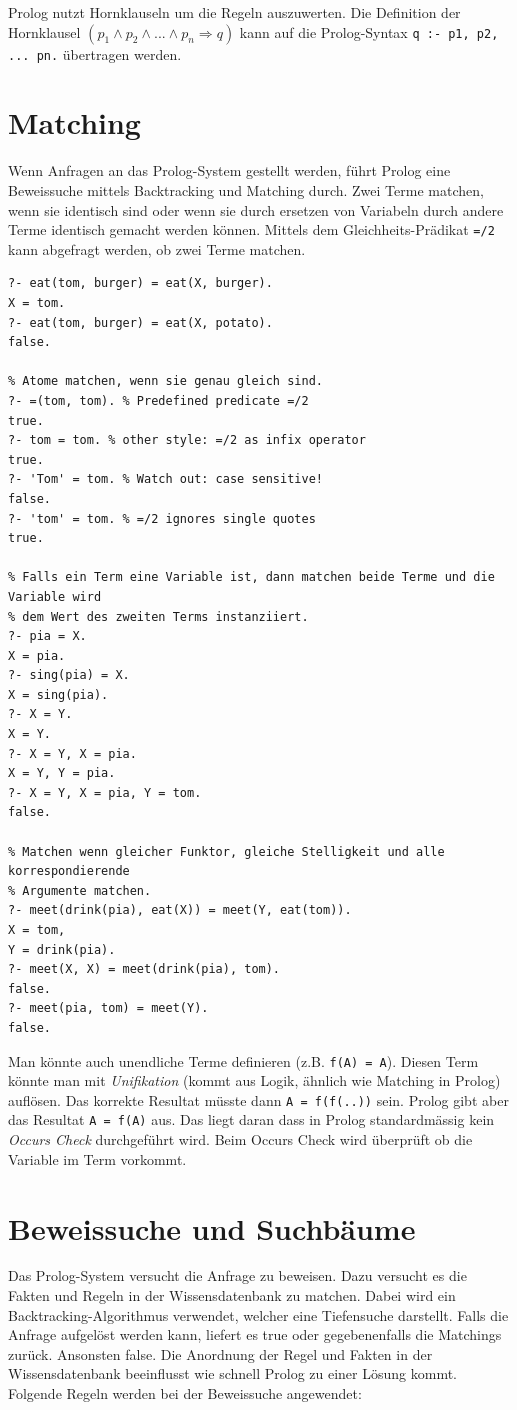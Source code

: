 Prolog nutzt Hornklauseln um die Regeln auszuwerten. Die Definition der Hornklausel $(p_1 \wedge p_2 \wedge ... \wedge p_n \Rightarrow q)$ kann auf die Prolog-Syntax \verb|q :- p1, p2, ... pn.| übertragen werden.

\section{Matching}

Wenn Anfragen an das Prolog-System gestellt werden, führt Prolog eine Beweissuche mittels Backtracking und Matching durch. Zwei Terme matchen, wenn sie identisch sind oder wenn sie durch ersetzen von Variabeln durch andere Terme identisch gemacht werden können. Mittels dem Gleichheits-Prädikat \verb|=/2| kann abgefragt werden, ob zwei Terme matchen.

\begin{lstlisting}[caption=Gleichheits-Prädikat]
?- eat(tom, burger) = eat(X, burger).
X = tom.
?- eat(tom, burger) = eat(X, potato).
false.

% Atome matchen, wenn sie genau gleich sind.
?- =(tom, tom). % Predefined predicate =/2
true.
?- tom = tom. % other style: =/2 as infix operator
true.
?- 'Tom' = tom. % Watch out: case sensitive!
false.
?- 'tom' = tom. % =/2 ignores single quotes
true.

% Falls ein Term eine Variable ist, dann matchen beide Terme und die Variable wird 
% dem Wert des zweiten Terms instanziiert.
?- pia = X.
X = pia.
?- sing(pia) = X.
X = sing(pia).
?- X = Y.
X = Y.
?- X = Y, X = pia.
X = Y, Y = pia.
?- X = Y, X = pia, Y = tom.
false.

% Matchen wenn gleicher Funktor, gleiche Stelligkeit und alle korrespondierende 
% Argumente matchen.
?- meet(drink(pia), eat(X)) = meet(Y, eat(tom)).
X = tom,
Y = drink(pia).
?- meet(X, X) = meet(drink(pia), tom).
false.
?- meet(pia, tom) = meet(Y).
false.
\end{lstlisting}

Man könnte auch unendliche Terme definieren (z.B. \verb|f(A) = A|). Diesen Term könnte man mit \textit{Unifikation} (kommt aus Logik, ähnlich wie Matching in Prolog) auflösen. Das korrekte Resultat müsste dann \verb|A = f(f(..))| sein. Prolog gibt aber das Resultat \verb|A = f(A)| aus. Das liegt daran dass in Prolog standardmässig kein \textit{Occurs Check} durchgeführt wird. Beim Occurs Check wird überprüft ob die Variable im Term vorkommt.

\section{Beweissuche und Suchbäume}
Das Prolog-System versucht die Anfrage zu beweisen. Dazu versucht es die Fakten und Regeln in der Wissensdatenbank zu matchen. Dabei wird ein Backtracking-Algorithmus verwendet, welcher eine Tiefensuche darstellt. Falls die Anfrage aufgelöst werden kann, liefert es true oder gegebenenfalls die Matchings zurück. Ansonsten false. Die Anordnung der Regel und Fakten in der Wissensdatenbank beeinflusst wie schnell Prolog zu einer Lösung kommt. Folgende Regeln werden bei der Beweissuche angewendet:

